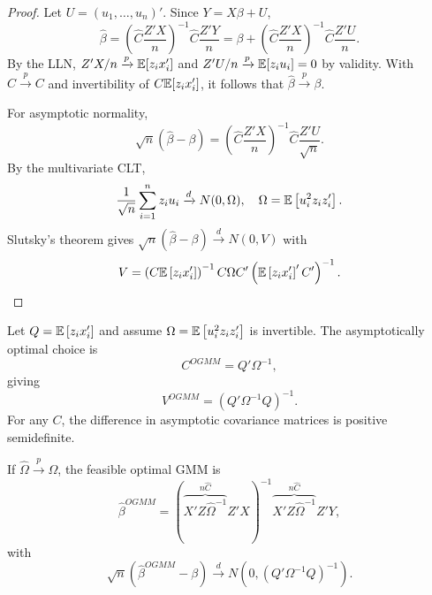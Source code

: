 \begin{proof}
	Let $U=(u_1,\ldots,u_n)'$. Since $Y=X\beta+U$,
	\[
		\hat{\beta}
		= \left(\hat{C}\frac{Z'X}{n}\right)^{-1}\hat{C}\frac{Z'Y}{n}
		= \beta + \left(\hat{C}\frac{Z'X}{n}\right)^{-1}\hat{C}\frac{Z'U}{n}
	.\]
	By the LLN, $Z'X/n\xrightarrow{p}\mathbb{E}[z_i x_i']$ and $Z'U/n\xrightarrow{p}\mathbb{E}[z_i u_i]=0$ by validity. With $\hat{C}\xrightarrow{p}C$ and invertibility of $C\mathbb{E}[z_i x_i']$, it follows that $\hat{\beta}\xrightarrow{p}\beta$.

	For asymptotic normality,
	\[
		\sqrt{n}(\hat{\beta}-\beta)=\left(\hat{C}\frac{Z'X}{n}\right)^{-1}\hat{C}\frac{Z'U}{\sqrt{n}}
	.\]
	By the multivariate CLT,
	\[
		\frac{1}{\sqrt{n}}\sum_{i=1}^{n} z_i u_i \xrightarrow{d} N(0,\Omega), \quad \Omega=\mathbb{E}\left[u_i^2 z_i z_i'\right]
	.\]
	Slutsky's theorem gives $\sqrt{n}(\hat{\beta}-\beta)\xrightarrow{d}N(0,V)$ with
	\[
		V = \left(C\mathbb{E}\left[z_i x_i'\right]\right)^{-1}C\Omega C'\left(\mathbb{E}\left[z_i x_i'\right]'C'\right)^{-1}
	.\]
\end{proof}

\begin{proposition}
	Let $Q=\mathbb{E}\left[z_i x_i'\right]$ and assume $\Omega= \mathbb{E}\left[u_i^2 z_iz_i'\right] $ is invertible. The asymptotically optimal choice is \[
		C^{OGMM}=Q'\Omega^{-1}
	,\]
	giving \[
		V^{OGMM} = (Q'\Omega^{-1}Q)^{-1}
	.\]
	For any $C$, the difference in asymptotic covariance matrices is positive semidefinite.

	If $\hat{\Omega}\xrightarrow{p}\Omega$, the feasible optimal GMM is \[
		\hat{\beta}^{OGMM} = (\overbrace{X'Z\hat{\Omega}^{-1}}^{n \hat{C}}Z'X)^{-1}\overbrace{X'Z\hat{\Omega}^{-1}}^{n \hat{C}}Z'Y
	,\]
	with \[
		\sqrt{n}(\hat{\beta}^{OGMM}-\beta) \xrightarrow{d} N\left(0,(Q'\Omega^{-1}Q)^{-1}\right)
	.\]
\end{proposition}

